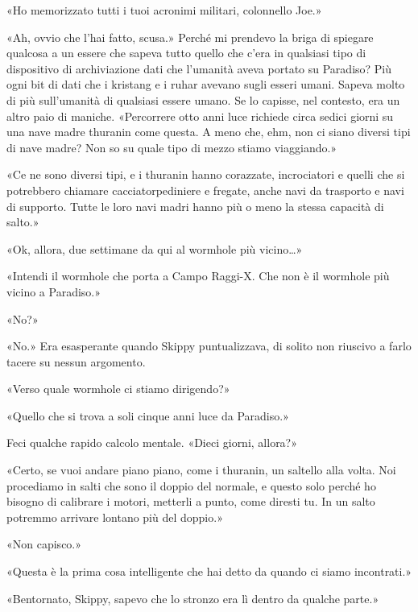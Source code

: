 «Ho memorizzato tutti i tuoi acronimi militari, colonnello Joe.»

«Ah, ovvio che l'hai fatto, scusa.» Perché mi prendevo la briga di
spiegare qualcosa a un essere che sapeva tutto quello che c'era in
qualsiasi tipo di dispositivo di archiviazione dati che l'umanità aveva
portato su Paradiso? Più ogni bit di dati che i kristang e i ruhar
avevano sugli esseri umani. Sapeva molto di più sull'umanità di
qualsiasi essere umano. Se lo capisse, nel contesto, era un altro paio
di maniche. «Percorrere otto anni luce richiede circa sedici giorni su
una nave madre thuranin come questa. A meno che, ehm, non ci siano
diversi tipi di nave madre? Non so su quale tipo di mezzo stiamo
viaggiando.»

«Ce ne sono diversi tipi, e i thuranin hanno corazzate, incrociatori e
quelli che si potrebbero chiamare cacciatorpediniere e fregate, anche
navi da trasporto e navi di supporto. Tutte le loro navi madri hanno più
o meno la stessa capacità di salto.»

«Ok, allora, due settimane da qui al wormhole più vicino\ldots»

«Intendi il wormhole che porta a Campo Raggi-X. Che non è il wormhole
più vicino a Paradiso.»

«No?»

«No.» Era esasperante quando Skippy puntualizzava, di solito non
riuscivo a farlo tacere su nessun argomento.

«Verso quale wormhole ci stiamo dirigendo?»

«Quello che si trova a soli cinque anni luce da Paradiso.»

Feci qualche rapido calcolo mentale. «Dieci giorni, allora?»

«Certo, se vuoi andare piano piano, come i thuranin, un saltello alla
volta. Noi procediamo in salti che sono il doppio del normale, e questo
solo perché ho bisogno di calibrare i motori, metterli a punto, come
diresti tu. In un salto potremmo arrivare lontano più del doppio.»

«Non capisco.»

«Questa è la prima cosa intelligente che hai detto da quando ci siamo
incontrati.»

«Bentornato, Skippy, sapevo che lo stronzo era lì dentro da qualche
parte.»

